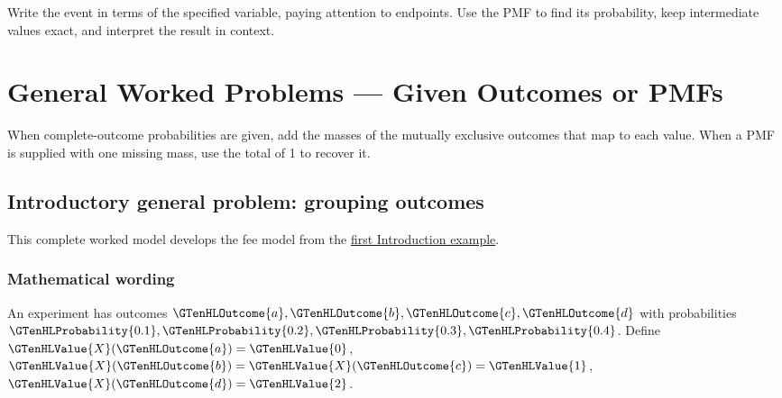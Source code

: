 \noindent{} Write the event in terms of the specified variable, paying attention to endpoints. Use the PMF to find its probability, keep intermediate values exact, and interpret the result in context.


\section{General Worked Problems --- Given Outcomes or PMFs}\label{sec:t2-c1-given-outcomes-or-pmfs}

 \vspace{5mm}

When complete-outcome probabilities are given, add the masses of the mutually exclusive outcomes that map to each value. When a PMF is supplied with one missing mass, use the total of 1 to recover it.

\subsection{Introductory general problem: grouping outcomes}
\label{subsec:t2-c1-introductory-general-problem-grouping-outcomes}
This complete worked model develops the fee model from the \hyperref[subsec:t2-c1-given-outcomes]{first Introduction example}.

\subsubsection*{Mathematical wording}
An experiment has outcomes $\GTenHLOutcome{a},\GTenHLOutcome{b},\GTenHLOutcome{c},\GTenHLOutcome{d}$ with probabilities $\GTenHLProbability{0.1},\GTenHLProbability{0.2},\GTenHLProbability{0.3},\GTenHLProbability{0.4}$. Define $\GTenHLValue{X}(\GTenHLOutcome{a})=\GTenHLValue{0}$, $\GTenHLValue{X}(\GTenHLOutcome{b})=\GTenHLValue{X}(\GTenHLOutcome{c})=\GTenHLValue{1}$, $\GTenHLValue{X}(\GTenHLOutcome{d})=\GTenHLValue{2}$.

